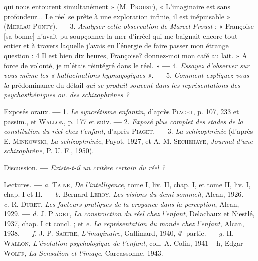 qui nous entourent simultanément » (M. \textsc{Proust}), « L’imaginaire
est sans profondeur... Le réel se prête à une exploration infinie, il est inépuisable »
(\textsc{Merlau-Ponty}). {\bf —} 3. {\it Analyser cette observation de Marcel
Proust} : « Françoise [sa bonne] n’avait pu soupçonner la mer d’irréel qui me
baignait encore tout entier et à travers laquelle j'avais eu l’énergie de faire
passer mon étrange question : 4 Il est bien dix heures, Françoise? donnez-moi
mon café au lait. » A force de volonté, je m'étais réintégré dans le réel. »
{\bf —} 4. {\it Essayez d'observer sur vous-même les « hallucinations hypnagogiques »}.
{\bf —} 5. {\it Comment expliquez-vous la} prédominance du détail {\it qui se produit
souvent dans les représentations des psychasthéniques ou. des schizophrènes ?}

Exposés oraux. {\bf —} 1. {\it Le syncrétisme enfantin}, d'après \textsc{Piaget}, p. 107,
233 et passim., et \textsc{Wallon}, p. 177 et suiv. {\bf —} 2. {\it Exposé plus complet des
stades de la constitution du réel chez l'enfant}, d'après \textsc{Piaget}. {\bf —} 3. {\it La
schizophrénie} (d’après E. \textsc{Minkowski}, {\it La schizophrénie}, Payot, 1927, et
A.-M. \textsc{Sechehaye}, {\it Journal d'une schizophrène}, P. U. F., 1950).

Discussion. {\bf —} {\it Existe-t-il un critère certain du réel ?}

Lectures. {\bf —} {\it a.} \textsc{Taine}, {\it De l'intelligence}, tome I, liv. II, chap. I, et tome II,
liv. I, chap. I et II. {\bf —} {\it b.} Bernard \textsc{Leroy}, {\it Les visions du demi-sommeil},
Alcan, 1926. {\bf —} {\it c.} R. \textsc{Duret}, {\it Les facteurs pratiques de la croyance dans la
perception}, Alcan, 1929. {\bf —} {\it d.} J. \textsc{Piaget}, {\it La construction du réel chez l'enfant},
Delachaux et Niestlé, 1937, chap. I ct concl. ; et {\it e.} {\it La représentation du
monde chez l'enfant}, Alcan, 1938. {\bf —} {\it f.} J.-P. \textsc{Sartre}, {\it L'imaginaire}, Gallimard,
1940, 4$^\text{e}$ partie. {\bf —} {\it g.} H. \textsc{Wallon}, {\it L'évolution psychologique de
l'enfant}, coll. A. Colin, 1941{\bf —}h, Edgar \textsc{Wolff}, {\it La Sensation et l'image},
Carcassonne, 1943.
